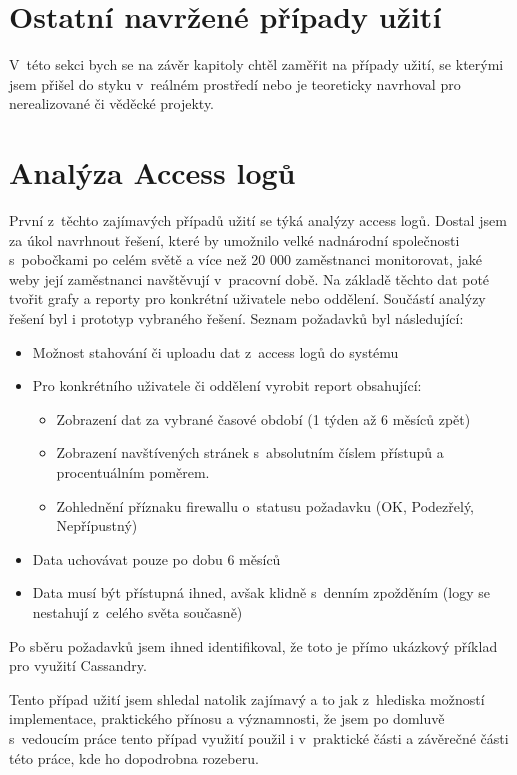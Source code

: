 \section{Ostatní navržené případy užití}

V~této sekci bych se na závěr kapitoly chtěl zaměřit na případy užití, se kterými jsem přišel do styku v~reálném prostředí nebo je teoreticky navrhoval pro nerealizované či věděcké projekty. 

\section{Analýza Access logů}
První z~těchto zajímavých případů užití se týká analýzy access logů. Dostal jsem za úkol navrhnout řešení, které by umožnilo velké nadnárodní společnosti s~pobočkami po celém světě a více než 20 000 zaměstnanci monitorovat, jaké weby její zaměstnanci navštěvují v~pracovní době. Na základě těchto dat poté tvořit grafy a reporty pro konkrétní uživatele nebo oddělení. Součástí analýzy řešení byl i prototyp vybraného řešení. Seznam požadavků byl následující: 

\begin{itemize}
\item Možnost stahování či uploadu dat z~access logů do systému
\item Pro konkrétního uživatele či oddělení vyrobit report obsahující:
\begin{itemize}
\item Zobrazení dat za vybrané časové období (1 týden až 6 měsíců zpět) 
\item Zobrazení navštívených stránek s~absolutním číslem přístupů a procentuálním poměrem. 
\item Zohlednění příznaku firewallu o~statusu požadavku (OK, Podezřelý, Nepřípustný)  
\end{itemize}
\item Data uchovávat pouze po dobu 6 měsíců 
\item Data musí být přístupná ihned, avšak klidně s~denním zpožděním (logy se nestahují z~celého světa současně)
\end{itemize}

Po sběru požadavků jsem ihned identifikoval, že toto je přímo ukázkový příklad pro využití Cassandry. 

Tento případ užití jsem shledal natolik zajímavý a to jak z~hlediska možností implementace, praktického přínosu a významnosti, že jsem po domluvě s~vedoucím práce tento případ využití použil i v~praktické části a závěrečné části této práce, kde ho dopodrobna rozeberu.

